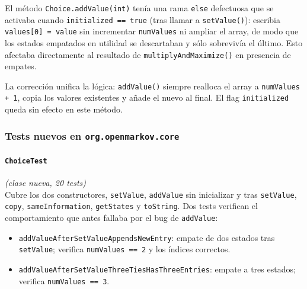 \documentclass[11pt,a4paper]{article}
\newcommand{\code}[1]{\texttt{#1}}
\begin{document}
El método \code{Choice.addValue(int)} tenía una rama \code{else} defectuosa
que se activaba cuando \code{initialized == true} (tras llamar a
\code{setValue()}): escribia \code{values[0] = value} sin incrementar
\code{numValues} ni ampliar el array, de modo que los estados empatados en
utilidad se descartaban y sólo sobrevivía el último.  Esto afectaba
directamente al resultado de \code{multiplyAndMaximize()} en presencia de empates.

La corrección unifica la lógica: \code{addValue()} siempre realloca el array
a \code{numValues + 1}, copia los valores existentes y añade el nuevo al final.
El flag \code{initialized} queda sin efecto en este método.

\subsubsection*{Tests nuevos en \code{org.openmarkov.core}}

\paragraph{\code{ChoiceTest}} \emph{(clase nueva, 20 tests)}\\
Cubre los dos constructores, \code{setValue}, \code{addValue} sin inicializar y
tras \code{setValue}, \code{copy}, \code{sameInformation}, \code{getStates} y
\code{toString}.  Dos tests verifican el comportamiento que antes fallaba por el
bug de \code{addValue}:
\begin{itemize}
  \item \code{addValueAfterSetValueAppendsNewEntry}: empate de dos estados tras
        \code{setValue}; verifica \code{numValues == 2} y los índices correctos.
  \item \code{addValueAfterSetValueThreeTiesHasThreeEntries}: empate a tres
        estados; verifica \code{numValues == 3}.
\end{itemize}
\end{document}
